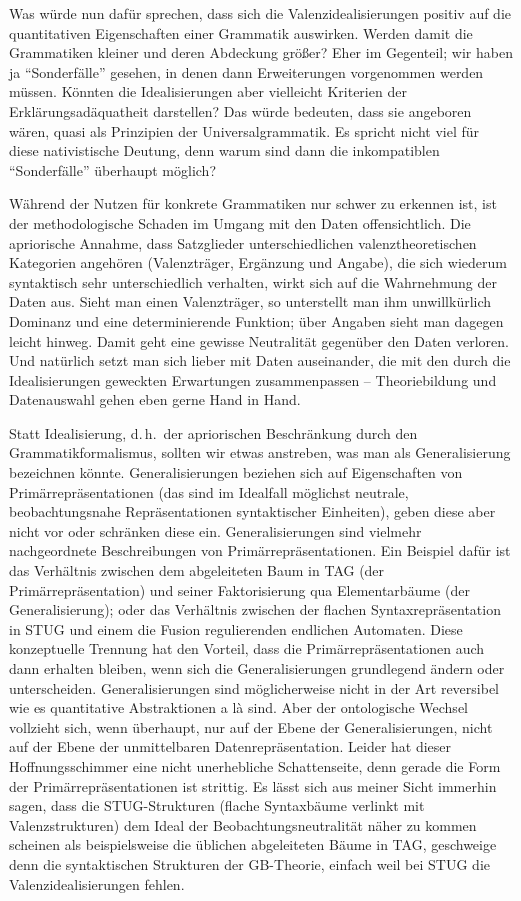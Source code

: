 Was würde nun dafür sprechen, dass sich die Valenzidealisierungen positiv auf die quantitativen Eigenschaften einer Grammatik auswirken. Werden damit die Grammatiken kleiner und deren Abdeckung größer? Eher im Gegenteil; wir haben ja "`Sonderfälle"' gesehen, in denen dann Erweiterungen vorgenommen werden müssen. Könnten die Idealisierungen aber vielleicht Kriterien der Erklärungsadäquatheit darstellen? Das würde bedeuten, dass sie angeboren wären, quasi als Prinzipien der Universalgrammatik. Es spricht nicht viel für diese nativistische Deutung, denn warum sind dann die inkompatiblen "`Sonderfälle"' überhaupt möglich?

Während der Nutzen für konkrete Grammatiken nur schwer zu erkennen ist, ist der methodologische Schaden im Umgang mit den Daten offensichtlich. Die apriorische Annahme, dass Satzglieder unterschiedlichen valenztheoretischen Kategorien angehören (Valenzträger, Ergänzung und Angabe), die sich wiederum syntaktisch sehr unterschiedlich verhalten, wirkt sich auf die Wahrnehmung der Daten aus. Sieht man einen Valenzträger, so unterstellt man ihm unwillkürlich Dominanz und eine determinierende Funktion; über Angaben sieht man dagegen leicht hinweg. Damit geht eine gewisse Neutralität gegenüber den Daten verloren. Und natürlich setzt man sich lieber mit Daten auseinander, die mit den durch die Idealisierungen geweckten Erwartungen zusammenpassen -- Theoriebildung und Datenauswahl gehen eben gerne Hand in Hand. 

Statt Idealisierung, d.\,h.\ der apriorischen Beschränkung durch den Grammatikformalismus, sollten wir etwas anstreben, was man als Generalisierung bezeichnen könnte. Generalisierungen beziehen sich auf Eigenschaften von Primärrepräsentationen (das sind im Idealfall möglichst neutrale, beobachtungsnahe Repräsentationen syntaktischer Einheiten), geben diese aber nicht vor oder schränken diese ein. Generalisierungen sind vielmehr nachgeordnete Beschreibungen von Primärrepräsentationen. Ein Beispiel dafür ist das Verhältnis zwischen dem abgeleiteten Baum in TAG (der Primärrepräsentation) und seiner Faktorisierung qua Elementarbäume (der Generalisierung); oder das Verhältnis zwischen der flachen Syntaxrepräsentation in STUG und einem die Fusion regulierenden endlichen Automaten. Diese konzeptuelle Trennung hat den Vorteil, dass die Primärrepräsentationen auch dann erhalten bleiben, wenn sich die Generalisierungen grundlegend ändern oder unterscheiden. Generalisierungen sind möglicherweise nicht in der Art reversibel wie es quantitative Abstraktionen a là \cite{Stokhof:Lambalgen:11} sind. Aber der ontologische Wechsel vollzieht sich, wenn überhaupt, nur auf der Ebene der Generalisierungen, nicht auf der Ebene der unmittelbaren Datenrepräsentation. Leider hat dieser Hoffnungsschimmer  eine nicht unerhebliche Schattenseite, denn gerade die Form der Primärrepräsentationen ist strittig. Es lässt sich aus meiner Sicht immerhin sagen, dass die STUG-Strukturen (flache Syntaxbäume verlinkt mit Valenzstrukturen) dem Ideal der Beobachtungsneutralität näher zu kommen scheinen als beispielsweise die üblichen abgeleiteten Bäume in TAG, geschweige denn die syntaktischen Strukturen der GB-Theorie, einfach weil bei STUG die Valenzidealisierungen fehlen.

